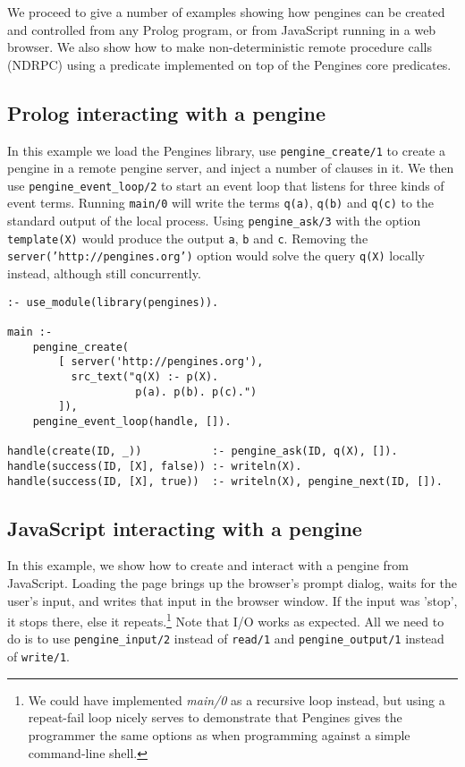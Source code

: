 \documentclass{new_tlp}
\begin{document}
We proceed to give a number of examples showing how pengines can be
created and controlled from any Prolog program, or from JavaScript
running in a web browser. We also show how to make non-deterministic
remote procedure calls (NDRPC) using a predicate implemented on top of
the Pengines core predicates.

\subsection{Prolog interacting with a pengine}
\label{sec:ex1}

In this example we load the Pengines library, use
\texttt{pengine\_create/1} to create a pengine in a remote
pengine server, and inject a number of clauses in it. We then  use
\texttt{pengine\_event\_loop/2}  to start an event loop that listens for
three kinds of  event terms. Running \texttt{main/0} will write  the
terms  \texttt{q(a)},  \texttt{q(b)}  and   \texttt{q(c)}  to  the
standard output of the local process.  Using \texttt{pengine\_ask/3}
with the option \texttt{template(X)}
would produce the output \texttt{a}, \texttt{b} and \texttt{c}. Removing
the \texttt{server('http://pengines.org')} option would solve the query
\texttt{q(X)} locally instead, although still concurrently.

\begin{verbatim}
:- use_module(library(pengines)).

main :-
    pengine_create(
        [ server('http://pengines.org'),
          src_text("q(X) :- p(X).
                    p(a). p(b). p(c).")
        ]),
    pengine_event_loop(handle, []).

handle(create(ID, _))           :- pengine_ask(ID, q(X), []).
handle(success(ID, [X], false)) :- writeln(X).
handle(success(ID, [X], true))  :- writeln(X), pengine_next(ID, []).
\end{verbatim}

\subsection{JavaScript interacting with a pengine}

In this example, we show  how  to   create  and  interact with a
pengine from JavaScript.   Loading the page brings up the
browser's prompt dialog, waits   for the user's input, and writes that
input in the browser  window.   If  the input was 'stop', it stops
there, else it repeats.\footnote{We could have implemented
\textit{main/0} as a recursive loop instead, but using a repeat-fail
loop nicely serves to demonstrate that Pengines gives the programmer the
same options as when programming against a simple command-line shell.}
Note that   I/O  works as expected. All we need to  do is to use
\texttt{pengine\_input/2}   instead  of \texttt{read/1}  and
\texttt{pengine\_output/1} instead of \texttt{write/1}.
\end{document}
